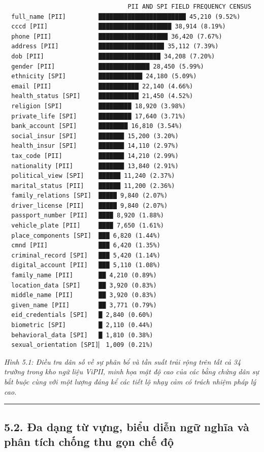 \documentclass[
  11pt,
  a4paper,
]{article}
\begin{document}
\begin{verbatim}
                                  PII AND SPI FIELD FREQUENCY CENSUS
  full_name [PII]         ████████████████████████ 45,210 (9.52%)
  cccd [PII]              ████████████████████ 38,914 (8.19%)
  phone [PII]             ███████████████████ 36,420 (7.67%)
  address [PII]           ██████████████████ 35,112 (7.39%)
  dob [PII]               █████████████████ 34,208 (7.20%)
  gender [PII]            ██████████████ 28,450 (5.99%)
  ethnicity [SPI]         ████████████ 24,180 (5.09%)
  email [PII]             ███████████ 22,140 (4.66%)
  health_status [SPI]     ███████████ 21,450 (4.52%)
  religion [SPI]          █████████ 18,920 (3.98%)
  private_life [SPI]      █████████ 17,640 (3.71%)
  bank_account [SPI]      ████████ 16,810 (3.54%)
  social_insur [SPI]      ███████ 15,200 (3.20%)
  health_insur [SPI]      ███████ 14,110 (2.97%)
  tax_code [PII]          ███████ 14,210 (2.99%)
  nationality [PII]       ███████ 13,840 (2.91%)
  political_view [SPI]    ██████ 11,240 (2.37%)
  marital_status [PII]    ██████ 11,200 (2.36%)
  family_relations [SPI]  █████ 9,840 (2.07%)
  driver_license [PII]    █████ 9,840 (2.07%)
  passport_number [PII]   ████ 8,920 (1.88%)
  vehicle_plate [PII]     ████ 7,650 (1.61%)
  place_components [SPI]  ███ 6,820 (1.44%)
  cmnd [PII]              ███ 6,420 (1.35%)
  criminal_record [SPI]   ███ 5,420 (1.14%)
  digital_account [PII]   ███ 5,110 (1.08%)
  family_name [PII]       ██ 4,210 (0.89%)
  location_data [SPI]     ██ 3,920 (0.83%)
  middle_name [PII]       ██ 3,920 (0.83%)
  given_name [PII]        ██ 3,771 (0.79%)
  eid_credentials [SPI]   █ 2,840 (0.60%)
  biometric [SPI]         █ 2,110 (0.44%)
  behavioral_data [SPI]   █ 1,810 (0.38%)
  sexual_orientation [SPI]▏ 1,009 (0.21%)
\end{verbatim}

\emph{Hình 5.1: Điều tra dân số về sự phân bổ và tần suất trải rộng trên
tất cả 34 trường trong kho ngữ liệu ViPII, minh họa mật độ cao của các
bằng chứng dân sự bắt buộc cùng với một lượng đáng kể các tiết lộ nhạy
cảm có trách nhiệm pháp lý cao.}

\begin{center}\rule{0.5\linewidth}{0.5pt}\end{center}

\subsection{5.2. Đa dạng từ vựng, biểu diễn ngữ nghĩa và phân tích chống
thu gọn chế
độ}\label{ux111a-dux1ea1ng-tux1eeb-vux1ef1ng-biux1ec3u-diux1ec5n-ngux1eef-nghux129a-vuxe0-phuxe2n-tuxedch-chux1ed1ng-thu-gux1ecdn-chux1ebf-ux111ux1ed9}
\end{document}
